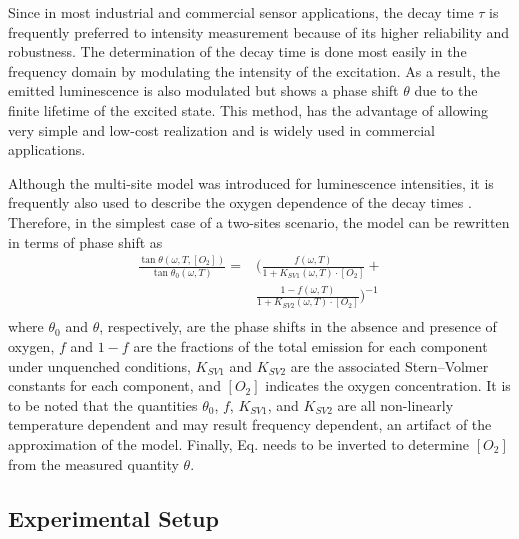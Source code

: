 \documentclass[9pt,twocolumn,twoside,pdftex]{optica}
\begin{document}
Since in most industrial and commercial sensor applications, the decay time $\tau$ is frequently preferred to intensity measurement because of its higher reliability and robustness. The determination of the decay time is done most easily in the frequency domain by modulating the intensity of the excitation.  As a result, the emitted luminescence is also modulated but shows a phase shift $\theta$ due to the finite lifetime of the excited state. This method, has the advantage of allowing very simple and low-cost realization and is widely used in commercial applications.

Although the multi-site model was introduced for luminescence intensities, it is frequently also used to describe the oxygen dependence of the decay times \cite{Demas1995,Quaranta2012}. Therefore, in the simplest case of a two-sites scenario, the model can be rewritten in terms of phase shift as \cite{Michelucci2019}
\begin{equation}
\begin{aligned}
\frac{\tan \theta (\omega, T, [O_2])}{\tan \theta_0 (\omega, T)} =& \bigg( \frac{f (\omega , T) }{1+K_{SV1} (\omega , T) \cdot \left[O_2\right]}+ \\
&\frac{1-f (\omega , T) }{1+K_{SV2} (\omega , T) \cdot \left[O_2\right]} \bigg)^{-1} \\
\label{theta_full}
\end{aligned}
\end{equation}
where $\theta_0$ and $\theta$, respectively, are the phase shifts in the absence and presence of oxygen, $f$ and $1-f$ are the fractions of the total emission for each component under unquenched conditions, $K_{SV1}$ and $K_{SV2}$ are the associated Stern–Volmer constants for each component, and $\left[O_2\right]$ indicates the oxygen concentration. It is to be noted that the quantities $\theta_0$, $f$, $K_{SV1}$, and $K_{SV2}$ are all non-linearly temperature dependent and may result frequency dependent, an artifact of the approximation of the model. Finally, Eq. \cite{theta_full} needs to be inverted to determine $[O_2]$ from the measured quantity $\theta$.


\subsection{Experimental Setup}
\label{Experimental}
\end{document}
